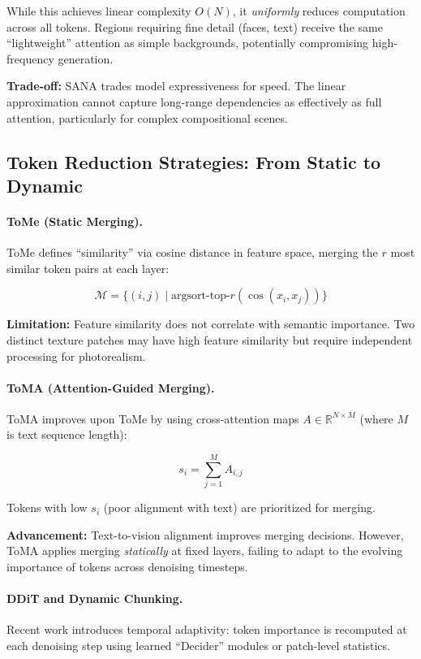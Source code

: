 \documentclass{article}
\begin{document}
While this achieves linear complexity $O(N)$, it \textit{uniformly} reduces
computation across all tokens. Regions requiring fine detail (faces, text)
receive the same ``lightweight'' attention as simple backgrounds, potentially
compromising high-frequency generation.

\textbf{Trade-off:} SANA trades model expressiveness for speed. The linear
approximation cannot capture long-range dependencies as effectively as full
attention, particularly for complex compositional scenes.

\subsection{Token Reduction Strategies: From Static to Dynamic}

\paragraph{ToMe (Static Merging).}
ToMe \cite{bolya2023token} defines ``similarity'' via cosine distance in feature
space, merging the $r$ most similar token pairs at each layer:

$$
    \mathcal{M} = \{(i, j) \mid \text{argsort-top-}r(\cos(x_i, x_j))\}
$$

\textbf{Limitation:} Feature similarity does not correlate with semantic
importance. Two distinct texture patches may have high feature similarity
but require independent processing for photorealism.

\paragraph{ToMA (Attention-Guided Merging).}
ToMA \cite{lu2025toma} improves upon ToMe by using cross-attention maps
$A \in \mathbb{R}^{N \times M}$ (where $M$ is text sequence length):

$$
    s_i = \sum_{j=1}^{M} A_{i,j}
$$

Tokens with low $s_i$ (poor alignment with text) are prioritized for merging.

\textbf{Advancement:} Text-to-vision alignment improves merging decisions.
However, ToMA applies merging \textit{statically} at fixed layers, failing
to adapt to the evolving importance of tokens across denoising timesteps.

\paragraph{DDiT and Dynamic Chunking.}
Recent work \cite{kim2026ddit, haridas2026dynamic} introduces temporal
adaptivity: token importance is recomputed at each denoising step using
learned ``Decider'' modules or patch-level statistics.
\end{document}
